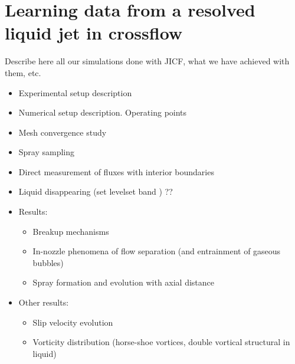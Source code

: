 \chapter{Learning data from a resolved liquid jet in crossflow}
	\label{ch5:jicf_resolved_simulations}



Describe here all our simulations done with JICF, what we have achieved with them, etc.

\begin{itemize}

	\item Experimental setup description
	
	\item Numerical setup description. Operating points
	
	\item Mesh convergence study
	
	\item Spray sampling
	
	\item Direct measurement of fluxes with interior boundaries
	
	\item Liquid disappearing (set levelset band ) ??
	
	\item Results:
	
		\begin{itemize}
		
			\item Breakup mechanisms
			
			\item In-nozzle phenomena of flow separation (and entrainment of gaseous bubbles)
			
			\item Spray formation and evolution with axial distance
	
		\end{itemize}
		
	\item Other results:
	
		\begin{itemize}
		
			\item Slip velocity evolution
			
			\item Vorticity distribution (horse-shoe vortices, double vortical structural in liquid)
		
		\end{itemize}

\end{itemize}

